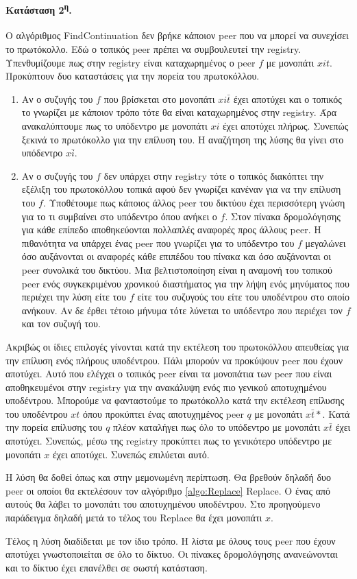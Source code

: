 \paragraph{Κατάσταση 2\textsuperscript{η}.}
Ο αλγόριθμος FindContinuation δεν βρήκε κάποιον peer που να μπορεί να 
συνεχίσει το πρωτόκολλο. Εδώ ο τοπικός peer πρέπει να συμβουλευτεί την 
registry. Υπενθυμίζουμε πως στην registry είναι καταχωρημένος ο peer $f$ 
με μονοπάτι $xit$. Προκύπτουν δυο καταστάσεις για την πορεία του πρωτοκόλλου. 
\begin{enumerate}
\item Αν ο συζυγής του $f$ που βρίσκεται στο μονοπάτι $xi \bar t$ έχει 
αποτύχει και ο τοπικός το γνωρίζει με κάποιον τρόπο τότε θα είναι 
καταχωρημένος στην registry. Άρα ανακαλύπτουμε πως το υπόδεντρο με μονοπάτι 
$xi$ έχει αποτύχει πλήρως. Συνεπώς ξεκινά το πρωτόκολλο για την επίλυση του. 
Η αναζήτηση της λύσης θα γίνει στο υπόδεντρο $x \bar i$.
\item Αν ο συζυγής του $f$ δεν υπάρχει στην registry τότε ο τοπικός διακόπτει 
την εξέλιξη του πρωτοκόλλου τοπικά αφού δεν γνωρίζει κανέναν για να την επίλυση 
του $f$. Υποθέτουμε πως κάποιος άλλος peer του δικτύου έχει περισσότερη γνώση 
για το τι συμβαίνει στο υπόδεντρο όπου ανήκει ο $f$. Στον πίνακα 
δρομολόγησης για κάθε επίπεδο αποθηκεύονται πολλαπλές αναφορές προς άλλους 
peer. Η πιθανότητα να υπάρχει ένας peer που γνωρίζει για το υπόδεντρο του 
$f$ μεγαλώνει όσο αυξάνονται οι αναφορές κάθε επιπέδου του πίνακα και όσο 
αυξάνονται οι peer συνολικά του δικτύου. 
Μια βελτιστοποίηση είναι η αναμονή του τοπικού peer ενός συγκεκριμένου 
χρονικού διαστήματος για την λήψη ενός μηνύματος που περιέχει την λύση είτε του 
$f$ είτε του συζυγούς του είτε του υποδέντρου στο οποίο ανήκουν. Αν δε έρθει 
τέτοιο μήνυμα τότε λύνεται το υπόδεντρο που περιέχει τον $f$ και τον συζυγή 
του.
\end{enumerate}

Ακριβώς οι ίδιες επιλογές γίνονται κατά την εκτέλεση του πρωτοκόλλου απευθείας 
για την επίλυση ενός πλήρους υποδέντρου. Πάλι μπορούν να προκύψουν peer που έχουν 
αποτύχει. Αυτό που ελέγχει ο τοπικός peer είναι τα μονοπάτια των peer 
που είναι αποθηκευμένοι στην registry για την ανακάλυψη ενός πιο γενικού 
αποτυχημένου υποδέντρου. Μπορούμε να φανταστούμε το πρωτόκολλο κατά την 
εκτέλεση επίλυσης του υποδέντρου $xt$ όπου προκύπτει ένας αποτυχημένος peer $q$
με μονοπάτι $x \bar t*$. Κατά την πορεία επίλυσης του $q$ πλέον καταλήγει 
πως όλο το υπόδεντρο με μονοπάτι $x \bar t$ έχει αποτύχει. Συνεπώς, μέσω της 
registry προκύπτει πως το γενικότερο υπόδεντρο με μονοπάτι $x$ έχει αποτύχει. 
Συνεπώς επιλύεται αυτό.

Η λύση θα δοθεί όπως και στην μεμονωμένη περίπτωση. Θα βρεθούν δηλαδή δυο 
peer οι οποίοι θα εκτελέσουν τον αλγόριθμο \ref{algo:Replace} Replace. Ο 
ένας από αυτούς θα λάβει το μονοπάτι του αποτυχημένου υποδέντρου. Στο 
προηγούμενο παράδειγμα δηλαδή μετά το τέλος του Replace θα έχει μονοπάτι 
$x$. 

Τέλος η λύση διαδίδεται με τον ίδιο τρόπο. Η λίστα με όλους τους peer που 
έχουν αποτύχει γνωστοποιείται σε όλο το δίκτυο. Οι πίνακες δρομολόγησης 
ανανεώνονται και το δίκτυο έχει επανέλθει σε σωστή κατάσταση.

